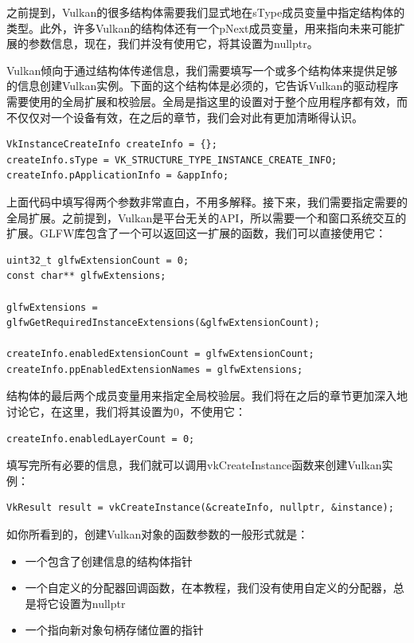 \documentclass{ctexart}
\begin{document}
之前提到，Vulkan的很多结构体需要我们显式地在sType成员变量中指定结构体的类型。此外，许多Vulkan的结构体还有一个pNext成员变量，用来指向未来可能扩展的参数信息，现在，我们并没有使用它，将其设置为nullptr。

Vulkan倾向于通过结构体传递信息，我们需要填写一个或多个结构体来提供足够的信息创建Vulkan实例。下面的这个结构体是必须的，它告诉Vulkan的驱动程序需要使用的全局扩展和校验层。全局是指这里的设置对于整个应用程序都有效，而不仅仅对一个设备有效，在之后的章节，我们会对此有更加清晰得认识。

\begin{lstlisting}[language={[ANSI]C}]
VkInstanceCreateInfo createInfo = {};
createInfo.sType = VK_STRUCTURE_TYPE_INSTANCE_CREATE_INFO;
createInfo.pApplicationInfo = &appInfo;
\end{lstlisting}

上面代码中填写得两个参数非常直白，不用多解释。接下来，我们需要指定需要的全局扩展。之前提到，Vulkan是平台无关的API，所以需要一个和窗口系统交互的扩展。GLFW库包含了一个可以返回这一扩展的函数，我们可以直接使用它：

\begin{lstlisting}[language={[ANSI]C}]
uint32_t glfwExtensionCount = 0;
const char** glfwExtensions;

glfwExtensions = glfwGetRequiredInstanceExtensions(&glfwExtensionCount);

createInfo.enabledExtensionCount = glfwExtensionCount;
createInfo.ppEnabledExtensionNames = glfwExtensions;
\end{lstlisting}

结构体的最后两个成员变量用来指定全局校验层。我们将在之后的章节更加深入地讨论它，在这里，我们将其设置为0，不使用它：

\begin{lstlisting}[language={[ANSI]C}]
createInfo.enabledLayerCount = 0;
\end{lstlisting}

填写完所有必要的信息，我们就可以调用vkCreateInstance函数来创建Vulkan实例：

\begin{lstlisting}[language={[ANSI]C}]
VkResult result = vkCreateInstance(&createInfo, nullptr, &instance);
\end{lstlisting}

如你所看到的，创建Vulkan对象的函数参数的一般形式就是：

\begin{itemize}
	\item 一个包含了创建信息的结构体指针
	\item 一个自定义的分配器回调函数，在本教程，我们没有使用自定义的分配器，总是将它设置为nullptr
	\item 一个指向新对象句柄存储位置的指针
\end{itemize}
\end{document}
